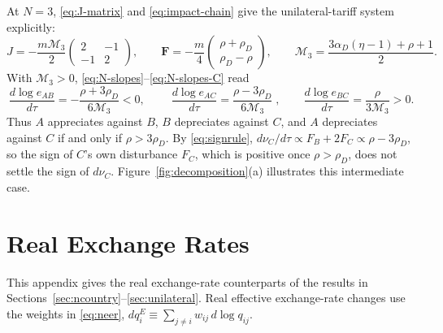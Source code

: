 \documentclass[11pt]{article}
\begin{document}
At $N=3$, \eqref{eq:J-matrix} and \eqref{eq:impact-chain} give the unilateral-tariff system explicitly:
\begin{equation}
J=-\frac{m\mathcal M_3}{2}
\begin{pmatrix}
2 & -1\\
-1 & 2
\end{pmatrix},
\qquad
\boldsymbol{F}=-\frac{m}{4}
\begin{pmatrix}
\rho+\rho_D\\
\rho_D-\rho
\end{pmatrix},
\qquad
\mathcal M_3=\frac{3\alpha_D(\eta-1)+\rho+1}{2}.
\label{eq:3c-JF}
\end{equation}
With $\mathcal M_3>0$, \eqref{eq:N-slopes}--\eqref{eq:N-slopes-C} read
\begin{equation}
\frac{d\log e_{AB}}{d\tau}
=-\frac{\rho+3\rho_D}{6\mathcal M_3}<0, \qquad
\boxed{\;\frac{d\log e_{AC}}{d\tau}
=\frac{\rho-3\rho_D}{6\mathcal M_3}\;}, \qquad
\frac{d\log e_{BC}}{d\tau}
=\frac{\rho}{3\mathcal M_3}>0.
\label{eq:3c-slopes}
\end{equation}
Thus $A$ appreciates against $B$, $B$ depreciates against $C$, and $A$ depreciates against $C$ if and only if $\rho>3\rho_D$. By \eqref{eq:signrule}, $d\nu_C/d\tau\propto F_B+2F_C\propto\rho-3\rho_D$, so the sign of $C$'s own disturbance $F_C$, which is positive once $\rho>\rho_D$, does not settle the sign of $d\nu_C$. Figure~\ref{fig:decomposition}(a) illustrates this intermediate case.

\FloatBarrier

\section{Real Exchange Rates}

\label{app:real}

This appendix gives the real exchange-rate counterparts of the results in Sections~\ref{sec:ncountry}--\ref{sec:unilateral}. Real effective exchange-rate changes use the weights in \eqref{eq:neer}, $dq_i^E\equiv\sum_{j\neq i}w_{ij}\,d\log q_{ij}$.
\end{document}
